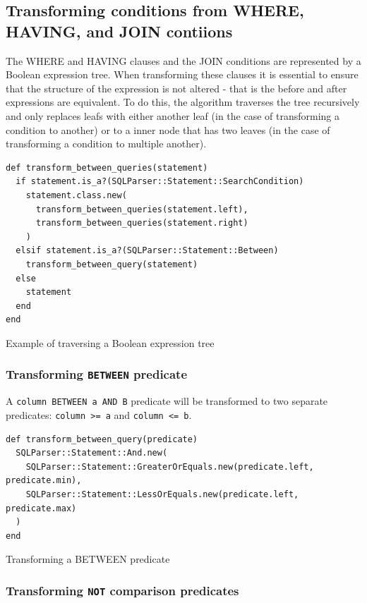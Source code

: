 \subsection{Transforming conditions from WHERE, HAVING, and JOIN contiions}
The WHERE and HAVING clauses and the JOIN conditions are represented by a Boolean expression tree. When transforming these clauses it is essential to ensure that the structure of the expression is not altered - that is the before and after expressions are equivalent. To do this, the algorithm traverses the tree recursively and only replaces leafs with either another leaf (in the case of transforming a condition to another) or to a inner node that has two leaves (in the case of transforming a condition to multiple another).

\begin{listing}[H]
\begin{verbatim}
def transform_between_queries(statement)
  if statement.is_a?(SQLParser::Statement::SearchCondition)
    statement.class.new(
      transform_between_queries(statement.left),
      transform_between_queries(statement.right)
    )
  elsif statement.is_a?(SQLParser::Statement::Between)
    transform_between_query(statement)
  else
    statement
  end
end
\end{verbatim}
\caption{Example of traversing a Boolean expression tree}
\end{listing}

\subsubsection{Transforming \texttt{BETWEEN} predicate}

A \texttt{column BETWEEN a AND B} predicate will be transformed to two separate predicates: \texttt{column >= a} and \texttt{column <= b}. 

\begin{listing}[ht]
\begin{verbatim}
def transform_between_query(predicate)
  SQLParser::Statement::And.new(
    SQLParser::Statement::GreaterOrEquals.new(predicate.left, predicate.min),
    SQLParser::Statement::LessOrEquals.new(predicate.left, predicate.max)
  )
end
\end{verbatim}
\caption{Transforming a BETWEEN predicate}
\label{fig:transforming_a_betweeb}
\end{listing}

\subsubsection{Transforming \texttt{NOT} comparison predicates}

